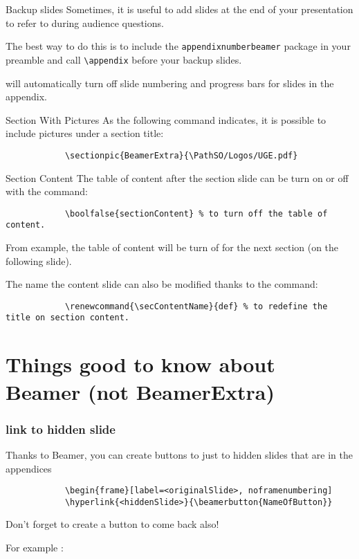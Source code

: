 	
	\begin{frame}[fragile]{Backup slides}
		Sometimes, it is useful to add slides at the end of your presentation to
		refer to during audience questions.
		
		The best way to do this is to include the \verb|appendixnumberbeamer|
		package in your preamble and call \verb|\appendix| before your backup slides.
		
		\themename will automatically turn off slide numbering and progress bars for
		slides in the appendix.
	\end{frame}
	
	\begin{frame}[fragile, label=previouSlide]{Section With Pictures}
		As the following command indicates, it is possible to include pictures under a section title:
		\begin{verbatim}			
			\sectionpic{BeamerExtra}{\PathSO/Logos/UGE.pdf}		
		\end{verbatim}
	\end{frame}

	\begin{frame}[fragile]{Section Content}
		The table of content after the section slide can be turn on or off with the command:
		\begin{verbatim}
			\boolfalse{sectionContent} % to turn off the table of content.
		\end{verbatim}
	
		From example, the table of content will be turn of for the next section (on the following slide).

		The name the content slide can also be modified thanks to the command:
		\begin{verbatim}
			\renewcommand{\secContentName}{def} % to redefine the title on section content.
		\end{verbatim}
	\end{frame}
	
	\renewcommand{\secContentName}{refined name}
\section{Things good to know about Beamer (not BeamerExtra)}
	
	\begin{frame}[fragile]
		\frametitle{link to hidden slide}
		
		Thanks to Beamer, you can create buttons to just to hidden slides that are in the appendices
		\begin{verbatim}			
			\begin{frame}[label=<originalSlide>, noframenumbering]	
			\hyperlink{<hiddenSlide>}{\beamerbutton{NameOfButton}}
		\end{verbatim}
		
		Don't forget to create a button to come back also!
		
		For example :
		\hyperlink{previouSlide}{}
	\end{frame}
	
